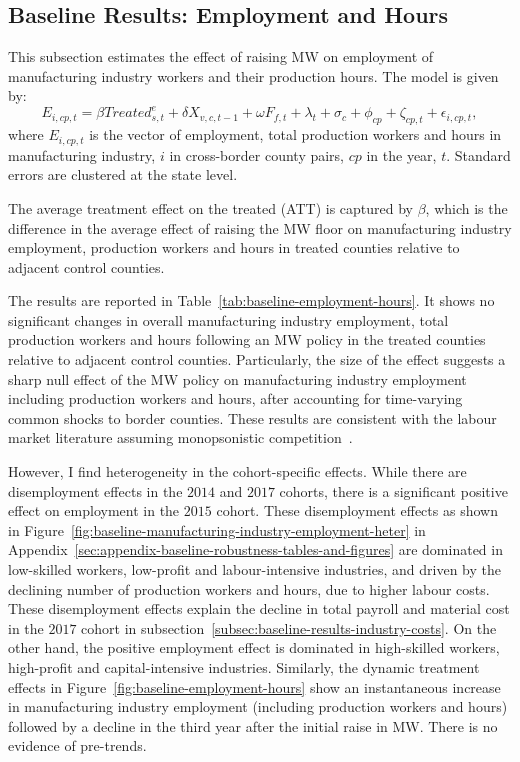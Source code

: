 \documentclass[authoryear, preprint, twocolumn, 1p]{elsarticle}
\begin{document}
    \subsection{Baseline Results: Employment and Hours}\label{subsec:baseline-results-employment-and-hours}
    This subsection estimates the effect of raising MW on employment of manufacturing industry workers and their production hours. The model is given by:
    \begin{equation}
        E_{i,cp,t} = \beta Treated_{s,t}^e + \delta X_{v,c,t-1} + \omega F_{f,t} + \lambda_{t} + \sigma_{c} + \phi_{cp} + \zeta_{cp,t} + \epsilon_{i,cp,t},\label{eq:baseline-emp-hours}
    \end{equation}
    where $E_{i,cp,t}$ is the vector of employment, total production workers and hours in manufacturing industry, $i$ in cross-border county pairs, $cp$ in the year, $t$. Standard errors are clustered at the state level.
    

    The average treatment effect on the treated (ATT) is captured by $\beta$, which is the difference in the average effect of raising the MW floor on manufacturing industry employment, production workers and hours in treated counties relative to adjacent control counties.

    The results are reported in Table~\ref{tab:baseline-employment-hours}. It shows no significant changes in overall manufacturing industry employment, total production workers and hours following an MW policy in the treated counties relative to adjacent control counties. Particularly, the size of the effect suggests a sharp null effect of the MW policy on manufacturing industry employment including production workers and hours, after accounting for time-varying common shocks to border counties. These results are consistent with the labour market literature assuming monopsonistic competition~\citep{card2000minimum, aaronson2018industry, cengiz2019effect, wong2019minimum, dustmann2022reallocation}.

    However, I find heterogeneity in the cohort-specific effects. While there are disemployment effects in the $2014$ and $2017$ cohorts, there is a significant positive effect on employment in the $2015$ cohort. These disemployment effects as shown in Figure~\ref{fig:baseline-manufacturing-industry-employment-heter} in Appendix~\ref{sec:appendix-baseline-robustness-tables-and-figures} are dominated in low-skilled workers, low-profit and labour-intensive industries, and driven by the declining number of production workers and hours, due to higher labour costs. These disemployment effects explain the decline in total payroll and material cost in the $2017$ cohort in subsection~\ref{subsec:baseline-results-industry-costs}. On the other hand, the positive employment effect is dominated in high-skilled workers, high-profit and capital-intensive industries. Similarly, the dynamic treatment effects in Figure~\ref{fig:baseline-employment-hours} show an instantaneous increase in manufacturing industry employment (including production workers and hours) followed by a decline in the third year after the initial raise in MW. There is no evidence of pre-trends.
    
\end{document}
